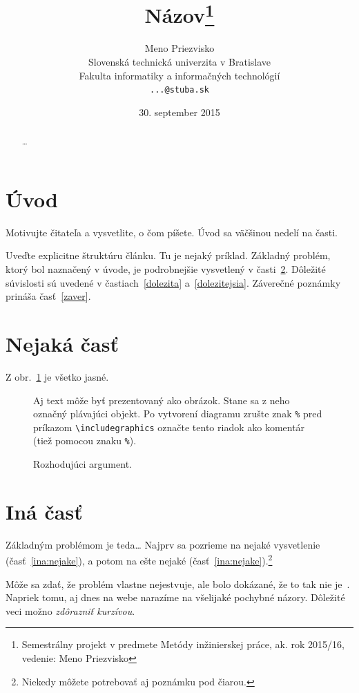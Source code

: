 \documentclass[10pt,twocolumn,twoside,slovak,a4paper]{article}
\title{Názov\thanks{Semestrálny projekt v predmete Metódy inžinierskej práce, ak. rok 2015/16, vedenie: Meno Priezvisko}} %
\author{Meno Priezvisko\\[2pt]
	{\small Slovenská technická univerzita v Bratislave}\\
	{\small Fakulta informatiky a informačných technológií}\\
	{\small \texttt{...@stuba.sk}}
	}
\date{\small 30. september 2015} %
\begin{document}
\maketitle

\begin{abstract}
\ldots
\end{abstract}



\section{Úvod}

Motivujte čitateľa a vysvetlite, o čom píšete. Úvod sa väčšinou nedelí na časti.

Uveďte explicitne štruktúru článku. Tu je nejaký príklad.
Základný problém, ktorý bol naznačený v úvode, je podrobnejšie vysvetlený v časti~\ref{nejaka}.
Dôležité súvislosti sú uvedené v častiach~\ref{dolezita} a~\ref{dolezitejsia}.
Záverečné poznámky prináša časť~\ref{zaver}.



\section{Nejaká časť} \label{nejaka}

Z obr.~\ref{f:rozhod} je všetko jasné. 

\begin{figure}[tbh]
\centering
Aj text môže byť prezentovaný ako obrázok. Stane sa z neho označný plávajúci objekt. Po vytvorení diagramu zrušte znak \texttt{\%} pred príkazom \verb|\includegraphics| označte tento riadok ako komentár (tiež pomocou znaku \texttt{\%}).
\caption{Rozhodujúci argument.}
\label{f:rozhod}
\end{figure}



\section{Iná časť} \label{ina}

Základným problémom je teda\ldots{} Najprv sa pozrieme na nejaké vysvetlenie (časť~\ref{ina:nejake}), a potom na ešte nejaké (časť~\ref{ina:nejake}).\footnote{Niekedy môžete potrebovať aj poznámku pod čiarou.}

Môže sa zdať, že problém vlastne nejestvuje\cite{Coplien:MPD}, ale bolo dokázané, že to tak nie je~\cite{Czarnecki:Staged, Czarnecki:Progress}. Napriek tomu, aj dnes na webe narazíme na všelijaké pochybné názory\cite{PLP-Framework}. Dôležité veci možno \emph{zdôrazniť kurzívou}.
\end{document}
